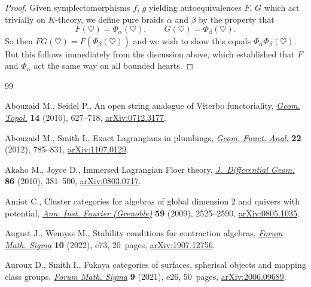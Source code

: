 \documentclass[10pt,a4paper]{amsart}
\theoremstyle{definition}
\numberwithin{equation}{section}
\begin{document}
\begin{proof}
Given symplectomorphisms $f$, $g$ yielding autoequivalences $F$, $G$ which act trivially on $K$-theory, we define pure braids $\alpha$ and $\beta$ by the property that
\[
F(\heartsuit) = \Phi_{\alpha}(\heartsuit), \qquad G(\heartsuit) = \Phi_{\beta}(\heartsuit).
\]
So then $FG(\heartsuit) = F(\Phi_{\beta}(\heartsuit))$ and we wish to show this equals $\Phi_{\alpha}\Phi_{\beta}(\heartsuit)$. But this follows immediately from the discussion above, which established that $F$ and $\Phi_\alpha$ act the same way on all bounded hearts.
\end{proof}

\begin{thebibliography}{99}
\footnotesize\itemsep=0pt

Abouzaid M., Seidel P., An open string analogue of {V}iterbo functoriality,
 \href{https://doi.org/10.2140/gt.2010.14.627}{\textit{Geom. Topol.}}
 \textbf{14} (2010), 627--718,
 \href{http://arxiv.org/abs/0712.3177}{arXiv:0712.3177}.

Abouzaid M., Smith I., Exact {L}agrangians in plumbings,
 \href{https://doi.org/10.1007/s00039-012-0162-y}{\textit{Geom. Funct. Anal.}}
 \textbf{22} (2012), 785--831,
 \href{http://arxiv.org/abs/1107.0129}{arXiv:1107.0129}.

Akaho M., Joyce D., Immersed {L}agrangian {F}loer theory,
 \href{https://doi.org/10.4310/jdg/1303219427}{\textit{J.~Differential Geom.}}
 \textbf{86} (2010), 381--500,
 \href{http://arxiv.org/abs/0803.0717}{arXiv:0803.0717}.

Amiot C., Cluster categories for algebras of global dimension 2 and quivers
 with potential, \href{https://doi.org/10.5802/aif.2499}{\textit{Ann. Inst.
 Fourier (Grenoble)}} \textbf{59} (2009), 2525--2590,
 \href{http://arxiv.org/abs/0805.1035}{arXiv:0805.1035}.

August J., Wemyss M., Stability conditions for contraction algebras,
 \href{https://doi.org/10.1017/fms.2022.65}{\textit{Forum Math. Sigma}}
 \textbf{10} (2022), e73, 20~pages,
 \href{http://arxiv.org/abs/1907.12756}{arXiv:1907.12756}.

Auroux D., Smith I., Fukaya categories of surfaces, spherical objects and
 mapping class groups,
 \href{https://doi.org/10.1017/fms.2021.21}{\textit{Forum Math. Sigma}}
 \textbf{9} (2021), e26, 50~pages,
 \href{http://arxiv.org/abs/2006.09689}{arXiv:2006.09689}.


\end{thebibliography}
\end{document}

